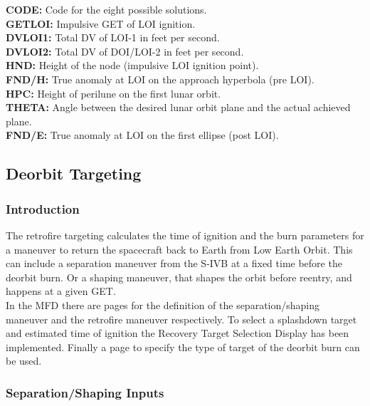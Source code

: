 \documentclass[11pt]{article} %
\begin{document}
\textbf{CODE:} Code for the eight possible solutions.\\
\textbf{GETLOI:} Impulsive GET of LOI ignition.\\
\textbf{DVLOI1:} Total DV of LOI-1 in feet per second.\\
\textbf{DVLOI2:} Total DV of DOI/LOI-2 in feet per second.\\
\textbf{HND:} Height of the node (impulsive LOI ignition point).\\
\textbf{FND/H:} True anomaly at LOI on the approach hyperbola (pre LOI).\\
\textbf{HPC:} Height of perilune on the first lunar orbit.\\
\textbf{THETA:} Angle between the desired lunar orbit plane and the actual achieved plane.\\
\textbf{FND/E:} True anomaly at LOI on the first ellipse (post LOI).\\
\newpage

\subsection{Deorbit Targeting}
\subsubsection{Introduction}

The retrofire targeting calculates the time of ignition and the burn parameters for a maneuver to return the spacecraft back to Earth from Low Earth Orbit. This can include a separation maneuver from the S-IVB at a fixed time before the deorbit burn. Or a shaping maneuver, that shapes the orbit before reentry, and happens at a given GET.\\

In the MFD there are pages for the definition of the separation/shaping maneuver and the retrofire maneuver respectively. To select a splashdown target and estimated time of ignition the Recovery Target Selection Display has been implemented. Finally a page to specify the type of target of the deorbit burn can be used.\\

\subsubsection{Separation/Shaping Inputs}
\end{document}
